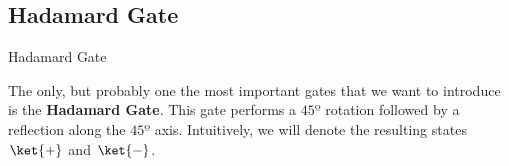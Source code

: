 \documentclass[9pt, handout, aspectratio=169]{beamer}		%
\begin{document}
	\subsection{Hadamard Gate}
	
	\begin{frame}{Hadamard Gate}
		
		The only, but probably one the most important gates that we want to introduce is the \textbf{Hadamard Gate}. This gate performs a $45º$ rotation followed by a reflection along the $45º$ axis. Intuitively, we will denote the resulting states $\ket{+}$ and $\ket{-}$.
		
		

\end{frame}
\end{document}
